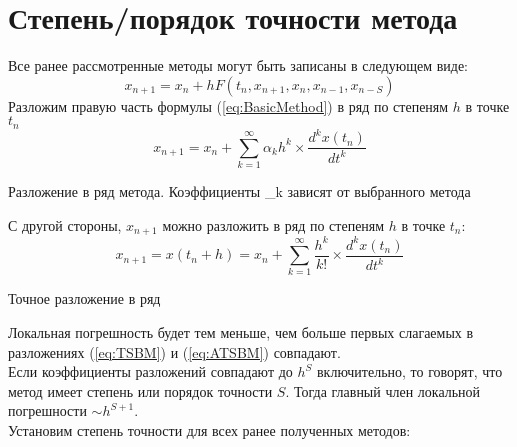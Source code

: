 \documentclass[a4paper,11pt]{article}
\begin{document}
\section{Степень/порядок точности метода\protect\footnotemark}
Все ранее рассмотренные методы могут быть записаны в следующем виде:
\begin{equation}
  x_{n+1} = x_n + hF(t_n, x_{n+1}, x_n, x_{n-1}, x_{n-S})
  \label{eq:BasicMethod}
\end{equation}
Разложим правую часть формулы (\ref{eq:BasicMethod}) в ряд по степеням $h$ в точке $t_n$
\begin{equation}
  x_{n+1} = x_n + \sum_{k=1}^{\infty} \alpha_kh^k \times \frac{d^kx(t_n)}{dt^k}
  \label{eq:TSBM}
\end{equation}
\begin{center}
  \small{Разложение в ряд метода. Коэффициенты \alpha_k зависят от выбранного метода}
\end{center}
С другой стороны, $x_{n+1}$ можно разложить в ряд по степеням $h$ в точке $t_n$:
\begin{equation}
  x_{n+1} = x(t_n + h) = x_n + \sum_{k=1}^{\infty} \frac{h^k}{k!} \times \frac{d^kx(t_n)}{dt^k}
  \label{eq:ATSBM}
\end{equation}
\begin{center}
  \small{Точное разложение в ряд}
\end{center}
Локальная погрешность будет тем меньше, чем больше первых слагаемых в разложениях (\ref{eq:TSBM}) и (\ref{eq:ATSBM}) совпадают. \\
Если коэффициенты разложений совпадают до $h^S$ включительно, то говорят, что метод имеет степень или порядок точности $S$.
  Тогда главный член локальной погрешности $\sim h^{S+1}$. \\
Установим степень точности для всех ранее полученных методов:
\end{document}
